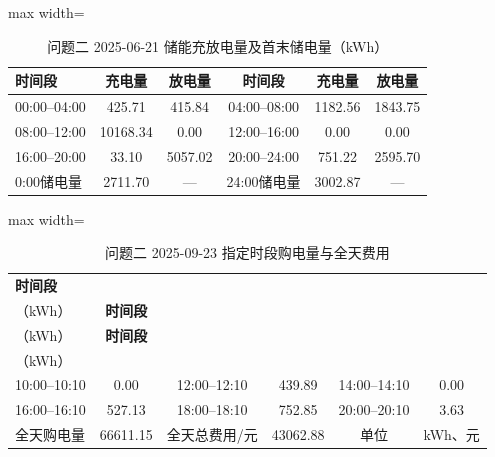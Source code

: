 \documentclass[UTF8,a4paper,zihao=-4,fontset=windows]{ctexart}
\begin{document}
\begin{table}[H]\centering
\fontsize{9.5}{12}\selectfont\setlength{\tabcolsep}{4pt}\renewcommand{\arraystretch}{1.12}
\begin{adjustbox}{max width=\linewidth}\begin{tabular}{lccccc}\toprule
\textbf{时间段} & \textbf{充电量} & \textbf{放电量} & \textbf{时间段} & \textbf{充电量} & \textbf{放电量}\\\midrule
00:00–04:00 & 425.71 & 415.84 & 04:00–08:00 & 1182.56 & 1843.75\\
08:00–12:00 & 10168.34 & 0.00 & 12:00–16:00 & 0.00 & 0.00\\
16:00–20:00 & 33.10 & 5057.02 & 20:00–24:00 & 751.22 & 2595.70\\
0:00储电量 & 2711.70 & — & 24:00储电量 & 3002.87 & —\\
\bottomrule\end{tabular}\end{adjustbox}
\caption{问题二 2025-06-21 储能充放电量及首末储电量（kWh）}
\end{table}
\begin{table}[H]\centering
\fontsize{9.5}{12}\selectfont\setlength{\tabcolsep}{4pt}\renewcommand{\arraystretch}{1.12}
\begin{adjustbox}{max width=\linewidth}\begin{tabular}{lccccc}\toprule
\textbf{时间段} & \shortstack{\textbf{购电量}\\{\normalfont （kWh）}} & \textbf{时间段} & \shortstack{\textbf{购电量}\\{\normalfont （kWh）}} & \textbf{时间段} & \shortstack{\textbf{购电量}\\{\normalfont （kWh）}}\\\midrule
10:00–10:10 & 0.00 & 12:00–12:10 & 439.89 & 14:00–14:10 & 0.00\\
16:00–16:10 & 527.13 & 18:00–18:10 & 752.85 & 20:00–20:10 & 3.63\\
全天购电量 & 66611.15 & 全天总费用/元 & 43062.88 & 单位 & kWh、元\\
\bottomrule\end{tabular}\end{adjustbox}
\caption{问题二 2025-09-23 指定时段购电量与全天费用}
\end{table}
\end{document}
